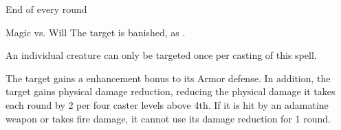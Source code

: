 \begin{spellheader}
    \spellrng{\rngmed}
\end{spellheader}
\begin{spelleffects}
    \begin{spelltrigger}{End of every round}
        \begin{spellattack}{Magic vs. Will}
            \spellsuccess The target is banished, as .
        \end{spellattack}
    \end{spelltrigger}
    \spelleffect An individual creature can only be targeted once per casting of this spell.
\end{spelleffects}
\begin{spellfooter}

\end{spellfooter}

\begin{spellheader}
    \spelldur{\durshort}
\end{spellheader}
\begin{spelleffects}
    \spelleffect The target gains a  enhancement bonus to its Armor defense. \spellbonusscalingdescription In addition, the target gains physical damage reduction, reducing the physical damage it takes each round by 2  per four caster levels above 4th. If it is hit by an adamatine weapon or takes fire damage, it cannot use its damage reduction for 1 round.
\end{spelleffects}
\begin{spellfooter}

\end{spellfooter}

